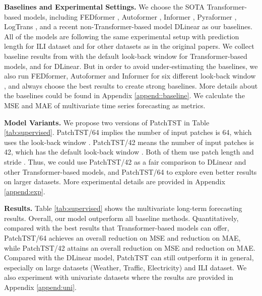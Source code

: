 \documentclass{article} \usepackage{iclr2023_conference,times}
\begin{document}
\textbf{Baselines and Experimental Settings.} We choose the SOTA Transformer-based models, including FEDformer \citep{fedformer}, Autoformer \citep{autoformer}, Informer \citep{informer}, Pyraformer \citep{pyraformer}, LogTrans \citep{logtrans}, and a recent non-Transformer-based model DLinear \citep{dlinear} as our baselines. All of the models are following the same experimental setup with prediction length  for ILI dataset and  for other datasets as in the original papers. We collect baseline results from \citet{dlinear} with the default look-back window  for Transformer-based models, and  for DLinear. But in order to avoid under-estimating the baselines, we also run FEDformer, Autoformer and Informer for six different look-back window , and always choose the best results to create strong baselines. More details about the baselines could be found in Appendix \ref{append::baseline}. We calculate the MSE and MAE of multivariate time series forecasting as metrics. 

\textbf{Model Variants.} We propose two versions of PatchTST in Table \ref{tab:supervised}. PatchTST/64 implies the number of input patches is 64, which uses the look-back window . PatchTST/42 means the number of input patches is 42, which has the default look-back window . Both of them use patch length  and stride . Thus, we could use PatchTST/42 as a fair comparison to DLinear and other Transformer-based models, and PatchTST/64 to explore even better results on larger datasets. More experimental details are provided in Appendix \ref{append:exp}.

\textbf{Results.} Table \ref{tab:supervised} shows the multivariate long-term forecasting results. Overall, our model outperform all baseline methods. Quantitatively, compared with the best results that Transformer-based models can offer, PatchTST/64 achieves an overall  reduction on MSE and  reduction on MAE, while PatchTST/42 attains an overall  reduction on MSE and  reduction on MAE. Compared with the DLinear model, PatchTST can still outperform it in general, especially on large datasets (Weather, Traffic, Electricity) and ILI dataset. We also experiment with univariate datasets where the results are provided in Appendix \ref{append:uni}. 
\end{document}
